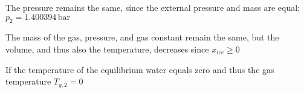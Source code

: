 The pressure remains the same, since the external pressure and mass are equal: \( p_2 = 1.400394 \, \text{bar} \)

The mass of the gas, pressure, and gas constant remain the same, but the volume, and thus also the temperature, decreases since \( x_{ice} \geq 0 \)

If the temperature of the equilibrium water equals zero and thus the gas temperature \( T_{g,2} = 0 \)